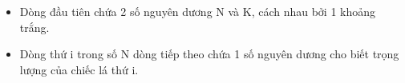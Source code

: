 \begin{itemize}
	\item     Dòng đầu tiên chứa 2 số nguyên dương N và K, cách nhau bởi 1 khoảng trắng.   
	\item     Dòng thứ i trong số N dòng tiếp theo chứa 1 số nguyên dương cho biết trọng lượng của chiếc lá thứ i.   
\end{itemize}